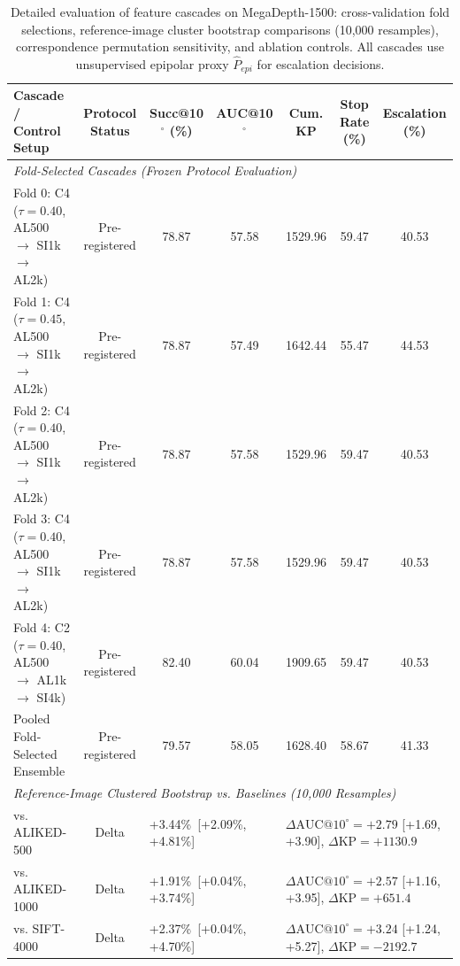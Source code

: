 \begin{table}[t]
\centering
\caption{Detailed evaluation of feature cascades on MegaDepth-1500: cross-validation fold selections, reference-image cluster bootstrap comparisons (10,000 resamples), correspondence permutation sensitivity, and ablation controls. All cascades use unsupervised epipolar proxy $\hat{P}_{epi}$ for escalation decisions.}
\label{tab:cascade_results}
\small
\begin{tabular}{lcccccc}
\hline
\textbf{Cascade / Control Setup} & \textbf{Protocol Status} & \textbf{Succ@10$^\circ$ (\%)} & \textbf{AUC@10$^\circ$} & \textbf{Cum. KP} & \textbf{Stop Rate (\%)} & \textbf{Escalation (\%)} \\
\hline
\multicolumn{7}{l}{\textit{Fold-Selected Cascades (Frozen Protocol Evaluation)}} \\
Fold 0: C4 ($\tau=0.40$, AL500 $\to$ SI1k $\to$ AL2k) & Pre-registered & 78.87 & 57.58 & 1529.96 & 59.47 & 40.53 \\
Fold 1: C4 ($\tau=0.45$, AL500 $\to$ SI1k $\to$ AL2k) & Pre-registered & 78.87 & 57.49 & 1642.44 & 55.47 & 44.53 \\
Fold 2: C4 ($\tau=0.40$, AL500 $\to$ SI1k $\to$ AL2k) & Pre-registered & 78.87 & 57.58 & 1529.96 & 59.47 & 40.53 \\
Fold 3: C4 ($\tau=0.40$, AL500 $\to$ SI1k $\to$ AL2k) & Pre-registered & 78.87 & 57.58 & 1529.96 & 59.47 & 40.53 \\
Fold 4: C2 ($\tau=0.40$, AL500 $\to$ AL1k $\to$ SI4k) & Pre-registered & 82.40 & 60.04 & 1909.65 & 59.47 & 40.53 \\
Pooled Fold-Selected Ensemble & Pre-registered & 79.57 & 58.05 & 1628.40 & 58.67 & 41.33 \\
\hline
\multicolumn{7}{l}{\textit{Reference-Image Clustered Bootstrap vs. Baselines (10,000 Resamples)}} \\
vs. ALIKED-500 & Delta & \multicolumn{2}{l}{+3.44\%\ [+2.09\%, +4.81\%]} & \multicolumn{3}{l}{$\Delta\text{AUC}@10^\circ = +2.79$ [+1.69, +3.90], $\Delta\text{KP} = +1130.9$} \\
vs. ALIKED-1000 & Delta & \multicolumn{2}{l}{+1.91\%\ [+0.04\%, +3.74\%]} & \multicolumn{3}{l}{$\Delta\text{AUC}@10^\circ = +2.57$ [+1.16, +3.95], $\Delta\text{KP} = +651.4$} \\
vs. SIFT-4000 & Delta & \multicolumn{2}{l}{+2.37\%\ [+0.04\%, +4.70\%]} & \multicolumn{3}{l}{$\Delta\text{AUC}@10^\circ = +3.24$ [+1.24, +5.27], $\Delta\text{KP} = -2192.7$} \\

\end{tabular}
\end{table}
